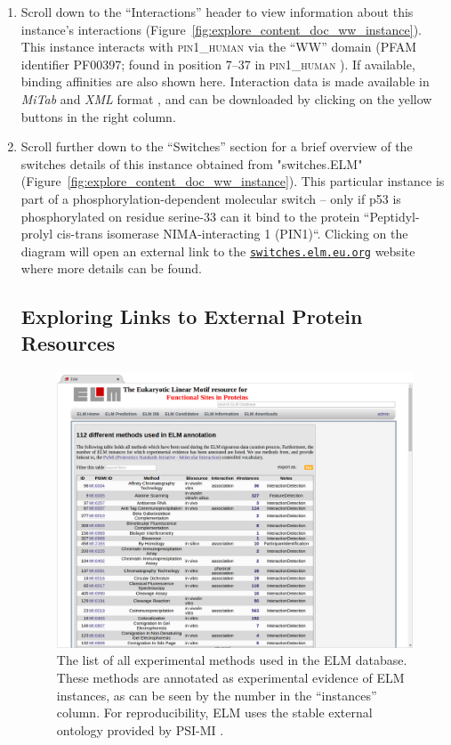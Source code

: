 \documentclass[12pt]{article}
\newcommand\rurl[1]{%
	\href{http://#1}{\nolinkurl{#1}}%
}
\newcommand\uniprot[1]{%
	\textsc{\lowercase{#1}}%
}
\newcommand\fileformat[1]{%
    \textit{#1}{}%
}%
\begin{document}
\begin{enumerate}
\item Scroll down to the ``Interactions'' header to view information about this
	instance's interactions
	(Figure~\ref{fig:explore_content_doc_ww_instance}). This instance
	interacts with \uniprot{PIN1\_Human} via the ``WW'' domain (PFAM identifier
	PF00397; found in position 7--37 in \uniprot{PIN1\_Human}). If available,
	binding affinities are also shown here. Interaction data is made
	available in \fileformat{MiTab} and \fileformat{XML} format
	\citep{17925023}, and can be downloaded by clicking on the yellow
	buttons in the right column.

\item Scroll further down to the ``Switches'' section for a brief overview of
	the switches details of this instance obtained from "switches.ELM"
	\citep{23550212} (Figure~\ref{fig:explore_content_doc_ww_instance}). This
	particular instance is part of a phosphorylation-dependent molecular switch --
	only if p53 is phosphorylated on residue serine-33 can it bind to the protein
	``Peptidyl-prolyl cis-trans isomerase NIMA-interacting 1 (PIN1)``.
	Clicking on the diagram will open an external link to the
	\rurl{switches.elm.eu.org} website where more details can be found.

%
%
\subsection*{Exploring Links to External Protein Resources}
\label{subsec:explore_content_links_to_external_resources}

\begin{figure}[h!]
	\centering
	\includegraphics[width=\textwidth]{Figures/9_methods.png}
	\caption{
		The list of all experimental methods used in the ELM database.
		These methods are annotated as experimental evidence of ELM
		instances, as can be seen by the number in the ``instances''
		column. For reproducibility, ELM uses the stable external
		ontology provided by PSI-MI \citep{17925023}.
	}
	\label{fig:explore_content_methods}
\end{figure}


\end{enumerate}
\end{document}
